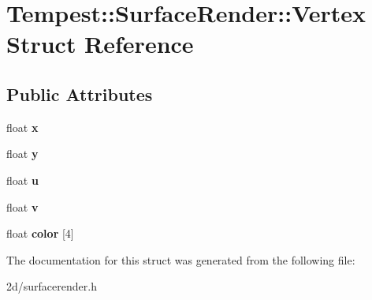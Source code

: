 \hypertarget{struct_tempest_1_1_surface_render_1_1_vertex}{\section{Tempest\+:\+:Surface\+Render\+:\+:Vertex Struct Reference}
\label{struct_tempest_1_1_surface_render_1_1_vertex}
}
\subsection*{Public Attributes}
\begin{DoxyCompactItemize}
\item 
\hypertarget{struct_tempest_1_1_surface_render_1_1_vertex_accbd99fb33ef98ac4134a6ab3c66d5aa}{float {\bfseries x}}\label{struct_tempest_1_1_surface_render_1_1_vertex_accbd99fb33ef98ac4134a6ab3c66d5aa}

\item 
\hypertarget{struct_tempest_1_1_surface_render_1_1_vertex_a5b0cb8edf8eadb64dd5b0f4202f63501}{float {\bfseries y}}\label{struct_tempest_1_1_surface_render_1_1_vertex_a5b0cb8edf8eadb64dd5b0f4202f63501}

\item 
\hypertarget{struct_tempest_1_1_surface_render_1_1_vertex_a7f5fe3f0d23a57bcdab63844dc2d55dc}{float {\bfseries u}}\label{struct_tempest_1_1_surface_render_1_1_vertex_a7f5fe3f0d23a57bcdab63844dc2d55dc}

\item 
\hypertarget{struct_tempest_1_1_surface_render_1_1_vertex_a9e9bdbe83d5ff61e6704c79e2ca20d2c}{float {\bfseries v}}\label{struct_tempest_1_1_surface_render_1_1_vertex_a9e9bdbe83d5ff61e6704c79e2ca20d2c}

\item 
\hypertarget{struct_tempest_1_1_surface_render_1_1_vertex_ab87b44ee8feb3fd13ad56d35ae896f25}{float {\bfseries color} \mbox{[}4\mbox{]}}\label{struct_tempest_1_1_surface_render_1_1_vertex_ab87b44ee8feb3fd13ad56d35ae896f25}

\end{DoxyCompactItemize}


The documentation for this struct was generated from the following file\+:\begin{DoxyCompactItemize}
\item 
2d/surfacerender.\+h\end{DoxyCompactItemize}
